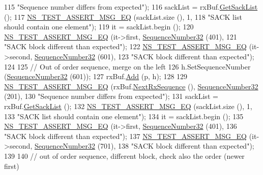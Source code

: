 \begin{DoxyCode}
115                          \textcolor{stringliteral}{"Sequence number differs from expected"});
116   sackList = rxBuf.\hyperlink{classns3_1_1TcpRxBuffer_afc5d672da4595330754de1bb3933a9c7}{GetSackList} ();
117   \hyperlink{group__testing_ga2a9d78cffb3db8e867c35fff0b698cf5}{NS\_TEST\_ASSERT\_MSG\_EQ} (sackList.size (), 1,
118                          \textcolor{stringliteral}{"SACK list should contain one element"});
119   it = sackList.begin ();
120   \hyperlink{group__testing_ga2a9d78cffb3db8e867c35fff0b698cf5}{NS\_TEST\_ASSERT\_MSG\_EQ} (it->first, \hyperlink{classns3_1_1SequenceNumber}{SequenceNumber32} (401),
121                          \textcolor{stringliteral}{"SACK block different than expected"});
122   \hyperlink{group__testing_ga2a9d78cffb3db8e867c35fff0b698cf5}{NS\_TEST\_ASSERT\_MSG\_EQ} (it->second, \hyperlink{classns3_1_1SequenceNumber}{SequenceNumber32} (601),
123                          \textcolor{stringliteral}{"SACK block different than expected"});
124 
125   \textcolor{comment}{// Out of order sequence, merge on the left}
126   h.SetSequenceNumber (\hyperlink{classns3_1_1SequenceNumber}{SequenceNumber32} (601));
127   rxBuf.\hyperlink{classns3_1_1TcpRxBuffer_a35a036383b8976cb79738c28aa01d5d0}{Add} (p, h);
128 
129   \hyperlink{group__testing_ga2a9d78cffb3db8e867c35fff0b698cf5}{NS\_TEST\_ASSERT\_MSG\_EQ} (rxBuf.\hyperlink{classns3_1_1TcpRxBuffer_ae994bf90329d10f17b59d32907b04ca9}{NextRxSequence} (), 
      \hyperlink{group__network_gacb2070e4e98d2d5135c9bede58f07a03}{SequenceNumber32} (201),
130                          \textcolor{stringliteral}{"Sequence number differs from expected"});
131   sackList = rxBuf.\hyperlink{classns3_1_1TcpRxBuffer_afc5d672da4595330754de1bb3933a9c7}{GetSackList} ();
132   \hyperlink{group__testing_ga2a9d78cffb3db8e867c35fff0b698cf5}{NS\_TEST\_ASSERT\_MSG\_EQ} (sackList.size (), 1,
133                          \textcolor{stringliteral}{"SACK list should contain one element"});
134   it = sackList.begin ();
135   \hyperlink{group__testing_ga2a9d78cffb3db8e867c35fff0b698cf5}{NS\_TEST\_ASSERT\_MSG\_EQ} (it->first, \hyperlink{classns3_1_1SequenceNumber}{SequenceNumber32} (401),
136                          \textcolor{stringliteral}{"SACK block different than expected"});
137   \hyperlink{group__testing_ga2a9d78cffb3db8e867c35fff0b698cf5}{NS\_TEST\_ASSERT\_MSG\_EQ} (it->second, \hyperlink{classns3_1_1SequenceNumber}{SequenceNumber32} (701),
138                          \textcolor{stringliteral}{"SACK block different than expected"});
139 
140   \textcolor{comment}{// out of order sequence, different block, check also the order (newer first)}

\end{DoxyCode}
